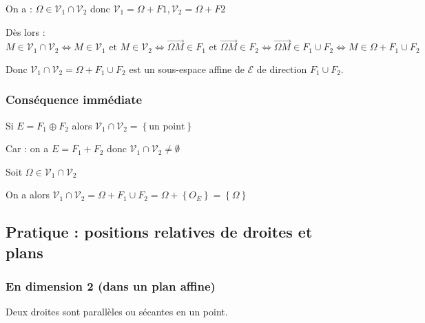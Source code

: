 \documentclass[12pt,a4paper,french]{book}
\begin{document}
				 On a : $\Omega \in \mathcal{V}_1 \cap\mathcal{V}_2$ donc $\mathcal{V}_1 = \Omega + F1, \mathcal{V}_2 = \Omega + F2 $
				 
				Dès lors : $M \in \mathcal{V}_1 \cap\mathcal{V}_2 \Leftrightarrow M \in \mathcal{V}_1 \mbox{ et } M \in \mathcal{V}_2 \Leftrightarrow \overrightarrow{\Omega M} \in F_1 \mbox{ et } \overrightarrow{\Omega M} \in F_2 \Leftrightarrow \overrightarrow{\Omega M} \in F_1 \cup F_2 \Leftrightarrow M \in \Omega + F_1 \cup F_2$ 
				
				Donc $\mathcal{V}_1 \cap\mathcal{V}_2 = \Omega + F_1 \cup F_2$ est un sous-espace affine de $\mathcal{E}$ de direction $ F_1 \cup F_2$.
			\subsubsection{Conséquence immédiate}
				Si $E = F_1 \oplus F_2 $ alors $\mathcal{V}_1 \cap\mathcal{V}_2 = \left\lbrace \mbox{un point}\right\rbrace $
				
				Car : on a $E = F_1 + F_2$ donc $\mathcal{V}_1 \cap\mathcal{V}_2 \neq \emptyset$
				
				Soit $\Omega \in \mathcal{V}_1 \cap\mathcal{V}_2$
				
				On a alors $\mathcal{V}_1 \cap\mathcal{V}_2 = \Omega + F_1 \cup F_2 = \Omega + \left\lbrace O_E \right\rbrace = \left\lbrace \Omega \right\rbrace $
		\subsection{Pratique : positions relatives de droites et plans}
			\subsubsection{En dimension 2 (dans un plan affine)}
				Deux droites sont parallèles ou sécantes en un point.
\end{document}
